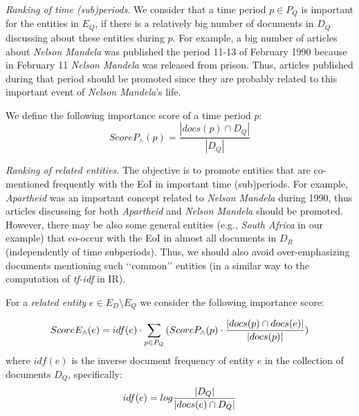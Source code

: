 \documentclass[runningheads,a4paper]{libtex/llncs}
\newcommand{\q}[1]{\lq\lq{}{}#1\rq\rq{}{}}
\begin{document}
\vspace{2mm}
\noindent
{\em Ranking of time (sub)periods}.
We consider that a time period $p \in P_Q$ is important
for the entities in $E_Q$, if there is a relatively big number of documents in $D_Q$
discussing about these entities during $p$.
For example, a big number of articles about {\em Nelson Mandela}
was published the period 11-13 of February 1990 because
in February 11 {\em Nelson Mandela} was released from prison.
Thus, articles published during that period should be promoted since
they are probably related to this important event of {\em Nelson Mandela}'s life.

We define the following importance score of a time period $p$:
\begin{equation}
ScoreP_\wedge(p) = \frac{|docs(p) \cap D_Q|}{|D_Q|}
\end{equation}


\vspace{2mm}
\noindent
{\em Ranking of related entities}.
The objective is to promote entities that are co-mentioned frequently with the EoI
in important time (sub)periods.
For example, {\em Apartheid} was an important concept
related to {\em Nelson Mandela} %
during 1990,
thus articles discussing for both {\em Apartheid} and {\em Nelson Mandela} %
should be promoted.
However, there may be also some general entities (e.g., {\em South Africa} in our example)
that co-occur with the EoI in almost all documents in $D_R$ (independently of time subperiods).
Thus, we should also avoid over-emphasizing documents mentioning such \q{common} entities
(in a similar way to the computation of {\em tf-idf} in IR).

For a {\em related entity} $e \in E_D \setminus E_Q$
we consider the following importance score:

\begin{equation}
\small
ScoreE_\wedge(e) = idf(e) \cdot \sum_{p \in P_Q}{(ScoreP_\wedge(p) \cdot \frac{|docs(p) \cap docs(e)|}{|docs(p)|})}
\end{equation}
where $idf(e)$ is the inverse document frequency
of entity $e$ in the collection of documents $D_Q$, specifically:
\begin{equation}
\small
idf(e) = log\frac{|D_Q|}{|docs(e) \cap D_Q|}
\end{equation}
\end{document}
